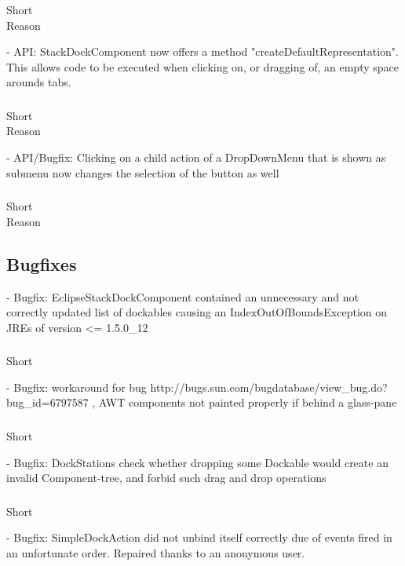 \documentclass[a4paper,10pt]{article}
\newcommand{\short}{\item[Short]}
\newcommand{\why}{\item[Reason]}
\begin{document}
\subsubsection{}
\begin{description}
 \short 
 \why 
\end{description}
- API: StackDockComponent now offers a method "createDefaultRepresentation". This allows code to be executed when clicking on, or dragging of, an empty space arounds tabs.
\subsubsection{}
\begin{description}
 \short 
 \why 
\end{description}
- API/Bugfix: Clicking on a child action of a DropDownMenu that is shown as submenu now changes the selection of the button as well  
\subsubsection{}
\begin{description}
 \short 
 \why 
\end{description}

\subsection{Bugfixes}

- Bugfix: EclipseStackDockComponent contained an unnecessary and not correctly updated list of dockables causing an IndexOutOfBoundsException on JREs of version <= 1.5.0_12
\subsubsection{}
\begin{description}
 \short 
\end{description}
- Bugfix: workaround for bug http://bugs.sun.com/bugdatabase/view_bug.do?bug_id=6797587 , AWT components not painted properly if behind a glass-pane
\subsubsection{}
\begin{description}
 \short 
\end{description}
- Bugfix: DockStations check whether dropping some Dockable would create an invalid Component-tree, and forbid such drag and drop operations
\subsubsection{}
\begin{description}
 \short 
\end{description}
- Bugfix: SimpleDockAction did not unbind itself correctly due of events fired in an unfortunate order. Repaired thanks to an anonymous user.
\end{document}
